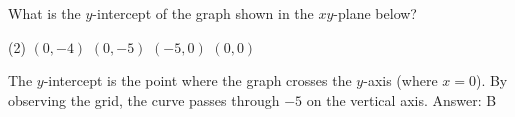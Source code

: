 \documentclass[11pt,paper=a4,answers]{exam}
\begin{document}
\begin{questions}
\vspace{1cm}
\question
What is the $y$-intercept of the graph shown in the $xy$-plane below?
\begin{center}
\end{center}
\begin{tasks}(2)
    \task $(0, -4)$ \task $(0, -5)$ \task $(-5, 0)$ \task $(0, 0)$
\end{tasks}

\begin{solution}
The $y$-intercept is the point where the graph crosses the $y$-axis (where $x=0$). By observing the grid, the curve passes through $-5$ on the vertical axis.
\vspace{5pt}
Answer: \colorbox{yellow!100}{B}
\end{solution}


\end{questions}
\end{document}
